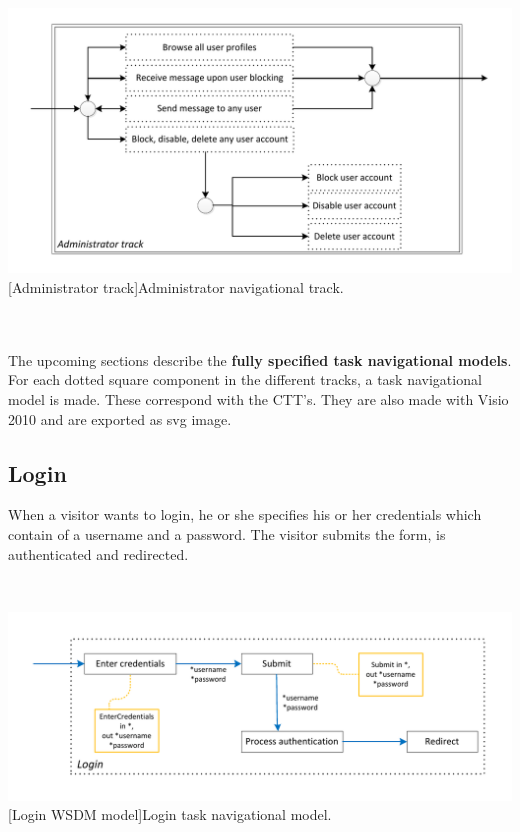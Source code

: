 \documentclass[11pt, a4paper,svglistings,oneside]{book}
\begin{document}
$\;$ \\
\noindent\begin{minipage}{\textwidth}
    \centering
   \includegraphics[scale=0.8]{Nav_Administrator_Track.pdf}
 [Administrator track]{Administrator navigational track.}
\end{minipage}
$\;$ \\ \\
The upcoming sections describe the \textbf{fully specified task navigational models}. For each dotted square component in the different tracks, a task navigational model is made. These correspond with the CTT's. They are also made with Visio 2010 and are exported as svg image.

\subsection{Login}

When a visitor wants to login, he or she specifies his or her credentials which contain of a username and a password. The visitor submits the form, is authenticated and redirected.

$\;$ \\
\noindent\begin{minipage}{\textwidth}
    \centering
   \includegraphics[scale=0.9]{Nav_Login.pdf}
 [Login WSDM model]{Login task navigational model.}
\end{minipage}
$\;$ \\ 
\end{document}
